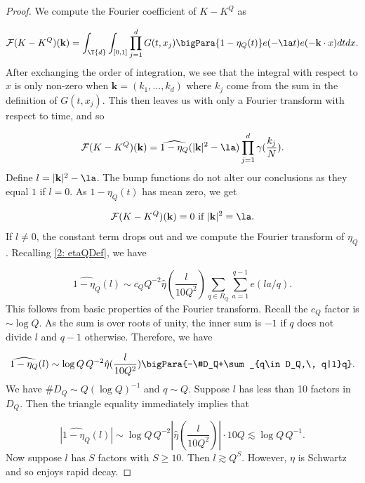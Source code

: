 \documentclass[11pt]{amsart}
\begin{document}
\begin{proof}
    We compute the Fourier coefficient of $K-K^Q$ as

    \begin{equation*}
        \mathcal{F}(K-K^Q)(\mathbf{k}) = \int_{\T{d}}\int_{[0,1]}\prod_{j=1}^dG(t,x_j)\bigPara{1-\eta_Q(t)} e(-\la t)e(-\mathbf{k}\cdot x)dtdx.
    \end{equation*}
    After exchanging the order of integration, we see that the integral with respect to $x$ is only non-zero when $\mathbf{k} = (k_1,...,k_d)$ where $k_j$ come from the sum in the definition of $G(t,x_j)$. This then leaves us with only a Fourier transform with respect to time, and so 

    \begin{equation*}
        \mathcal{F}(K-K^Q)(\mathbf{k}) = \widehat{1-\eta_Q}(|\mathbf{k}|^2-\la)\prod_{j=1}^d\gamma(\frac{k_j}{N}).
    \end{equation*}
    Define $l = |\mathbf{k}|^2-\la$. The bump functions do not alter our conclusions as they equal $1$ if $l = 0$. As $1-\eta_Q(t)$ has mean zero, we get

    \begin{equation*}
        \mathcal{F}(K-K^Q)(\mathbf{k}) = 0 \text{ if } |\mathbf{k}|^2=\la.
    \end{equation*}
    If $l\neq 0$, the constant term drops out and we compute the Fourier transform of $\eta_Q$. Recalling \eqref{2: etaQDef}, we have

    \begin{equation}\label{2: FourierTransNumberThrBoundEqn}
        \widehat{1-\eta_Q}(l) \sim c_Q Q^{-2}\hat{\eta}(\frac{l}{10Q^2})\sum_{q\in R_Q}\sum_{a=1}^{q-1}e(la/q).
    \end{equation}
    This follows from basic properties of the Fourier transform. Recall the $c_Q$ factor is $\sim \log Q$. As the sum is over roots of unity, the inner sum is $-1$ if $q$ does not divide $l$ and $q-1$ otherwise. Therefore, we have

    \begin{equation*}
        \widehat{1-\eta_Q}(l) \sim \log Q\, Q^{-2}\hat{\eta}(\frac{l}{10Q^2})\bigPara{-\#D_Q+\sum_{q\in D_Q,\, q|l}q}.
    \end{equation*}
    We have $\#D_Q\sim Q (\log Q)^{-1}$ and $q\sim Q$. Suppose $l$ has less than 10 factors in $D_Q$. Then the triangle equality immediately implies that

    \begin{equation*}
        |\widehat{1-\eta_Q}(l)| \sim \log Q\,Q^{-2}|\hat{\eta}(\frac{l}{10Q^2})|\cdot 10 Q \lesssim \log Q\,Q^{-1}.
    \end{equation*}
    Now suppose $l$ has $S$ factors with $S\geq 10$. Then $l\gtrsim Q^{S}$. However, $\eta$ is Schwartz and so enjoys rapid decay.


\end{proof}
\end{document}
